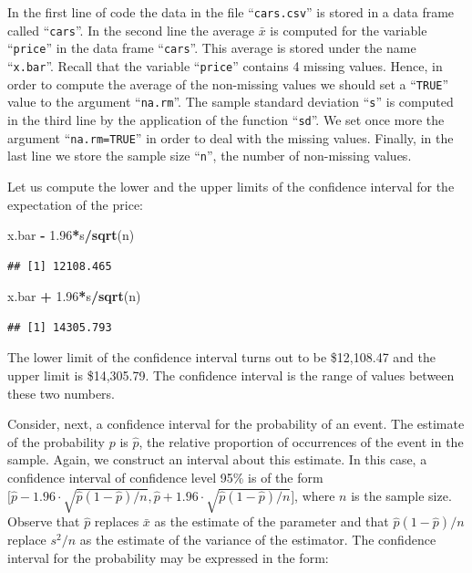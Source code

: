 \documentclass[]{krantz}
\makeatletter
\newenvironment{Shaded}{\begin{snugshade}}{\end{snugshade}}
\newcommand{\FloatTok}[1]{\textcolor[rgb]{0.00,0.00,0.81}{#1}}
\newcommand{\KeywordTok}[1]{\textcolor[rgb]{0.13,0.29,0.53}{\textbf{#1}}}
\newcommand{\NormalTok}[1]{#1}
\newcommand{\OperatorTok}[1]{\textcolor[rgb]{0.81,0.36,0.00}{\textbf{#1}}}
\newcommand{\StringTok}[1]{\textcolor[rgb]{0.31,0.60,0.02}{#1}}
\newenvironment{kframe}{%
\medskip{}
\setlength{\fboxsep}{.8em}
 \def\at@end@of@kframe{}%
 \ifinner\ifhmode%
  \def\at@end@of@kframe{\end{minipage}}%
  \begin{minipage}{\columnwidth}%
 \fi\fi%
 \def\FrameCommand##1{\hskip\@totalleftmargin \hskip-\fboxsep
 \colorbox{shadecolor}{##1}\hskip-\fboxsep
     \hskip-\linewidth \hskip-\@totalleftmargin \hskip\columnwidth}%
 \MakeFramed {\advance\hsize-\width
   \@totalleftmargin\z@ \linewidth\hsize
   \@setminipage}}%
 {\par\unskip\endMakeFramed%
 \at@end@of@kframe}
\renewenvironment{Shaded}{\begin{kframe}}{\end{kframe}}
\theoremstyle{definition}
\theoremstyle{definition}
\theoremstyle{definition}
\theoremstyle{remark}
\makeatother
\begin{document}
In the first line of code the data in the file ``\texttt{cars.csv}'' is stored in
a data frame called ``\texttt{cars}''. In the second line the average \(\bar x\) is
computed for the variable ``\texttt{price}'' in the data frame ``\texttt{cars}''. This
average is stored under the name ``\texttt{x.bar}''. Recall that the variable
``\texttt{price}'' contains 4 missing values. Hence, in order to compute the
average of the non-missing values we should set a ``\texttt{TRUE}'' value to the
argument ``\texttt{na.rm}''. The sample standard deviation ``\texttt{s}'' is computed in
the third line by the application of the function ``\texttt{sd}''. We set once
more the argument ``\texttt{na.rm=TRUE}'' in order to deal with the missing
values. Finally, in the last line we store the sample size ``\texttt{n}'', the
number of non-missing values.

Let us compute the lower and the upper limits of the confidence interval
for the expectation of the price:

\begin{Shaded}
\begin{Highlighting}[]
\NormalTok{x.bar }\OperatorTok{-}\StringTok{ }\FloatTok{1.96}\OperatorTok{*}\NormalTok{s}\OperatorTok{/}\KeywordTok{sqrt}\NormalTok{(n)}
\end{Highlighting}
\end{Shaded}

\begin{verbatim}
## [1] 12108.465
\end{verbatim}

\begin{Shaded}
\begin{Highlighting}[]
\NormalTok{x.bar }\OperatorTok{+}\StringTok{ }\FloatTok{1.96}\OperatorTok{*}\NormalTok{s}\OperatorTok{/}\KeywordTok{sqrt}\NormalTok{(n)}
\end{Highlighting}
\end{Shaded}

\begin{verbatim}
## [1] 14305.793
\end{verbatim}

The lower limit of the confidence interval turns out to be \$12,108.47
and the upper limit is \$14,305.79. The confidence interval is the range
of values between these two numbers.

Consider, next, a confidence interval for the probability of an event.
The estimate of the probability \(p\) is \(\hat p\), the relative proportion
of occurrences of the event in the sample. Again, we construct an
interval about this estimate. In this case, a confidence interval of
confidence level 95\% is of the form
\(\big[\hat p - 1.96 \cdot \sqrt{\hat p(1-\hat p)/n}, \hat p + 1.96 \cdot \sqrt{\hat p(1-\hat p)/n}\big]\),
where \(n\) is the sample size. Observe that \(\hat p\) replaces \(\bar x\) as
the estimate of the parameter and that \(\hat p(1-\hat p)/n\) replace
\(s^2/n\) as the estimate of the variance of the estimator. The confidence
interval for the probability may be expressed in the form:
\end{document}
